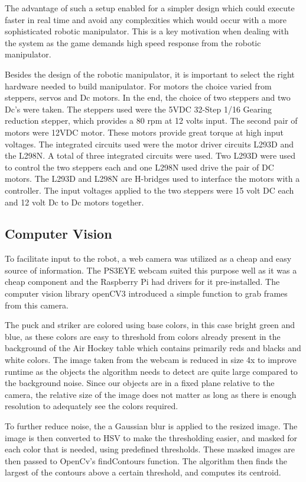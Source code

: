 \documentclass[letterpaper, 12 pt, conference]{ieeeconf}
\begin{document}
The advantage of such a setup enabled for a simpler design which could execute faster in real time and avoid any complexities which would occur with a more sophisticated robotic manipulator. This is a key motivation when dealing with the system as the game demands high speed response from the robotic manipulator.

Besides the design of the robotic manipulator, it is important to select the right hardware needed to build manipulator. For motors the choice varied from steppers, servos and Dc motors. In the end, the choice of two steppers and two Dc’s were taken. The steppers used were the 5VDC 32-Step 1/16 Gearing reduction stepper, which provides a 80 rpm at 12 volts input. The second pair of motors were 12VDC motor. These motors provide great torque at high input voltages. 
The integrated circuits used were the motor driver circuits L293D and the L298N. A total of three integrated circuits were used. Two L293D were used to control the two steppers each and one L298N used drive the pair of DC motors. The L293D and L298N are H-bridges used to interface the motors with a controller. The input voltages applied to the two steppers were 15 volt DC each and 12 volt Dc to Dc motors together. 

\subsection{Computer Vision}
\label{design-computervision}
To facilitate input to the robot, a web camera was utilized as a cheap and easy source of information. The PS3EYE webcam suited this purpose well as it was a cheap component and the Raspberry Pi had drivers for it pre-installed. The computer vision library openCV3 introduced a simple function to grab frames from this camera. 

The puck and striker are colored using base colors, in this case bright green and blue, as these colors are easy to threshold from colors already present in the background of the Air Hockey table which contains primarily reds and blacks and white colors. The image taken from the webcam is reduced in size 4x to improve runtime as the objects the algorithm needs to detect are quite large compared to the background noise. Since our objects are in a fixed plane relative to the camera, the relative size of the image does not matter as long as there is enough resolution to adequately see the colors required. 

To further reduce noise, the a Gaussian blur is applied to the resized image. The image is then converted to HSV to make the thresholding easier, and masked for each color that is needed, using predefined thresholds. These masked images are then passed to OpenCv’s findContours function. The algorithm then finds the largest of the contours above a certain threshold, and computes its centroid.
\end{document}

